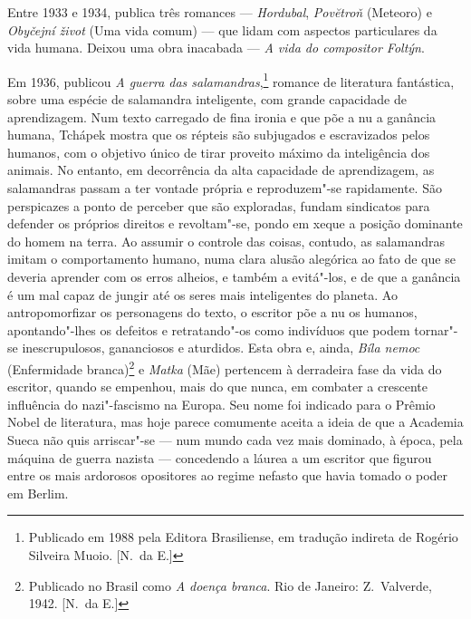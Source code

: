 Entre 1933 e 1934, publica três romances --- \textit{Hordubal}, \textit{Pov\u{e}troň} (Meteoro)
e \textit{Obyčejní život} (Uma vida comum) --- que lidam com aspectos particulares da vida
humana. Deixou uma obra inacabada --- \textit{A vida do compositor Foltýn}.

Em 1936, publicou \textit{A guerra das salamandras},\footnote{ Publicado em 1988 pela Editora Brasiliense, em tradução
indireta de Rogério Silveira Muoio. [N.~da E.]} romance de
literatura fantástica, sobre uma espécie de salamandra inteligente, com grande
capacidade de aprendizagem. Num texto carregado de fina ironia e que põe a nu a
ganância humana, Tchápek mostra que os répteis são subjugados e escravizados
pelos humanos, com o objetivo único de tirar proveito máximo da inteligência
dos animais. No entanto, em decorrência da alta capacidade de aprendizagem, as
salamandras passam a ter vontade própria e reproduzem"-se rapidamente. São
perspicazes a ponto de perceber que são exploradas, fundam sindicatos para
defender os próprios direitos e revoltam"-se, pondo em xeque a posição dominante
do homem na terra. Ao assumir o controle das coisas, contudo, as salamandras
imitam o comportamento humano, numa clara alusão alegórica ao fato de que se
deveria aprender com os erros alheios, e também a evitá"-los, e de que a ganância é
um mal capaz de jungir até os seres mais inteligentes do planeta. Ao
antropomorfizar os personagens do texto, o escritor põe a nu os humanos,
apontando"-lhes os defeitos e retratando"-os como indivíduos que podem tornar"-se
inescrupulosos, gananciosos e aturdidos. Esta obra e, ainda, \textit{Bíla nemoc} (Enfermidade branca)\footnote{ Publicado no Brasil como 
\textit{A doença branca}. Rio de Janeiro: \mbox{Z.~Valverde}, 1942.  [N.~da E.]}  
e \textit{Matka} (Mãe) pertencem à derradeira fase da vida do escritor,
quando se empenhou, mais do que nunca, em combater a crescente influência do
nazi"-fascismo na Europa. Seu nome foi indicado para o Prêmio Nobel de
literatura, mas hoje parece comumente aceita a ideia de que a Academia Sueca
não quis arriscar"-se --- num mundo cada vez mais dominado, à época, pela máquina
de guerra nazista --- concedendo a láurea a um escritor que figurou entre os mais
ardorosos opositores ao regime nefasto que havia tomado o poder em Berlim.

